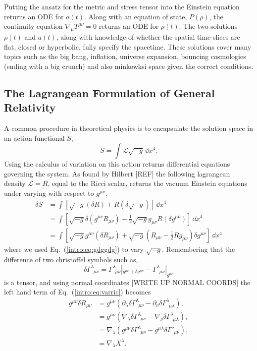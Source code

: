 Putting the ansatz for the metric and stress tensor into the Einstein equation returns an ODE for $a(t)$. Along with an equation of state, $P(\rho)$, the continuity equation $\nabla_\mu T^{\mu\nu}=0$ returns an ODE for $\rho(t)$. The two solutions $\rho(t)$ and $a(t)$, along with knowledge of whether the spatial time-slices are flat, closed or hyperbolic, fully specify the spacetime. These solutions cover many topics such as the big bang, inflation, universe expansion, bouncing cosmologies (ending with a big crunch) and also minkowksi space given the correct conditions. 



\subsection{The Lagrangean Formulation of General Relativity}
A common procedure in theoretical physics is to encapsulate the solution space in an action functional $S$,
\begin{equation}
S = \int \mathcal{L} \sqrt{-g} \,\dd x^4.
\end{equation}
Using the calculus of variation on this action returns differential equations governing the system. As found by Hilbert [REF] the following lagrangean density $\mathcal{L}=R$, equal to the Ricci scalar, returns the vacuum Einstein equations under varying with respect to $g^{\mu\nu}$.
\begin{align}
\delta S &= \int \left[\sqrt{-g} (\delta R) + R (\delta \sqrt{-g})\right]\,\dd x^4 \\
&= \int \left[\sqrt{-g} \delta(g^{\mu\nu}R_{\mu\nu}) -\frac{1}{2} \sqrt{-g} g_{\mu\nu}R (\delta g^{\mu\nu})\right]\,\dd x^4 \\
&= \int \left[\sqrt{-g}g^{\mu\nu}(\delta R_{\mu\nu}) + \sqrt{-g}\left(R_{\mu\nu}-\frac{1}{2}R g_{\mu\nu} \right)\delta g^{\mu\nu}\right]\,\dd x^4 \label{intro:eq:varric}
\end{align}  
where we used Eq.~(\ref{intro:eq:gdggdg}) to vary $\sqrt{-g}$. Remembering that the difference of two christoffel symbols such as,
\begin{equation}
\delta \Gamma^{\lambda}_{\,\,\,\mu\nu} = \Gamma^{\lambda}_{\,\,\,\mu\nu}|_{g^{\mu\nu}+\delta g^{\mu\nu}} - \Gamma^{\lambda}_{\,\,\,\mu\nu}|_{g^{\mu\nu}}
\end{equation} 
is a tensor, and using normal coordinates [WRITE UP NORMAL COORDS] the left hand term of Eq.~(\ref{intro:eq:varric}) becomes
\begin{align}
g^{\mu\nu} \delta R_{\mu\nu} &= g^{\mu\nu}\left( \partial_\lambda \delta\Gamma^{\lambda}_{\,\,\,\mu\nu} - \partial_\nu \delta\Gamma^{\lambda}_{\,\,\,\mu\lambda} \right), \\
&= g^{\mu\nu}\left( \nabla_\lambda \delta\Gamma^{\lambda}_{\,\,\,\mu\nu} - \nabla_\nu \delta\Gamma^{\lambda}_{\,\,\,\mu\lambda} \right), \\
&= \nabla_\lambda \left( g^{\mu\nu} \delta\Gamma^{\lambda}_{\,\,\,\mu\nu} - g^{\mu\lambda} \delta\Gamma^{\nu}_{\,\,\,\mu\nu} \right), \\
&=\nabla_\lambda X^\lambda.
\end{align}
